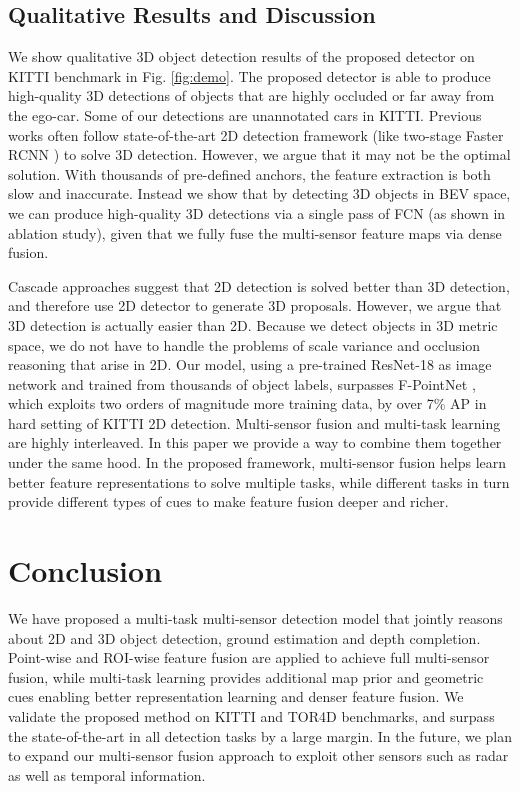 \documentclass[10pt,twocolumn,letterpaper]{article}
\begin{document}
\subsection{Qualitative Results and Discussion}
We show qualitative 3D object detection results of the proposed detector on KITTI benchmark in Fig. \ref{fig:demo}. The proposed detector is able to produce high-quality 3D detections of objects that are highly occluded or far away from the ego-car. Some of our detections are unannotated cars in KITTI.
Previous works \cite{mv3d, avod} often follow state-of-the-art 2D detection framework (like two-stage Faster RCNN \cite{faster}) to solve 3D detection. However, we argue that it may not be the optimal solution. With thousands of pre-defined anchors, the feature extraction is both slow and inaccurate. Instead we show that by detecting 3D objects in BEV space, we can produce high-quality 3D detections via a single pass of FCN (as shown in ablation study), given that we fully fuse the multi-sensor feature maps via dense fusion.

Cascade approaches \cite{fpointnet, fpccnn} suggest that 2D detection is solved better than 3D detection, and therefore use 2D detector to generate 3D proposals. However, we argue that 3D detection is actually easier than 2D. Because we detect objects in 3D metric space, we do not have to handle the problems of scale variance and occlusion reasoning that arise in 2D. Our model, using a pre-trained ResNet-18 as image network and trained from thousands of object labels, surpasses F-PointNet \cite{fpointnet}, which exploits two orders of magnitude more training data, by over 7\% AP in hard setting of KITTI 2D detection.
Multi-sensor fusion and multi-task learning are highly interleaved. In this paper we provide a way to combine them together under the same hood. In the proposed framework, multi-sensor fusion helps learn better feature representations to solve multiple tasks, while different tasks in turn provide different types of cues to make feature fusion deeper and richer.
 \section{Conclusion}

We have proposed a multi-task multi-sensor detection model that jointly reasons about 2D and 3D object detection, ground estimation and depth completion. Point-wise and ROI-wise feature fusion are applied to achieve full multi-sensor fusion, while multi-task learning provides additional map prior and geometric cues enabling better representation learning and denser feature fusion. We validate the proposed method on KITTI \cite{kitti} and TOR4D \cite{pixor} benchmarks, and surpass the  state-of-the-art  in all detection tasks by a large margin. In the future, we plan to expand our multi-sensor fusion approach to exploit other sensors such as radar as well as temporal information.  
 
\end{document}
